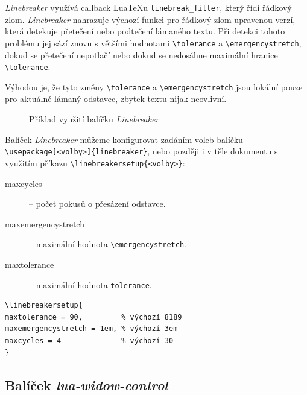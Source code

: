 \documentclass{csbulletin}
\newcommand\balicek[1]{\textit{#1}}
\begin{document}
\balicek{Linebreaker} využívá callback Lua\TeX u \verb|linebreak_filter|, který řídí řádkový zlom.
\balicek{Linebreaker} nahrazuje výchozí funkci pro řádkový zlom upravenou
verzí, která detekuje přetečení nebo podtečení lámaného textu. Při detekci
tohoto problému jej sází znovu s většími hodnotami \verb|\tolerance| a
\verb|\emergencystretch|, dokud se přetečení nepotlačí nebo dokud se nedosáhne
maximální hranice \verb|\tolerance|.

Výhodou je, že tyto změny \verb|\tolerance| a \verb|\emergencystretch| jsou lokální pouze 
pro aktuálně lámaný odstavec, zbytek textu nijak neovlivní. 


\begin{figure}
  \label{fig:linebreaker}
  \caption{Příklad využití balíčku \balicek{Linebreaker}}
\end{figure}


Balíček \balicek{Linebreaker} můžeme konfigurovat zadáním voleb balíčku
\texttt{\textbackslash usepackage[<volby>]\{linebreaker\}}, nebo později i v těle dokumentu s využitím příkazu
\texttt{\textbackslash linebreakersetup\{<volby>\}}:
\medskip

  \begin{description}
    \item[maxcycles] – počet pokusů o přesázení odstavce.
    \item[maxemergencystretch] – maximální hodnota \verb|\emergencystretch|.
    \item[maxtolerance] – maximální hodnota \verb|tolerance|.
  \end{description}

\medskip

\begin{verbatim}
\linebreakersetup{
maxtolerance = 90,         % výchozí 8189
maxemergencystretch = 1em, % výchozí 3em
maxcycles = 4              % výchozí 30
}
\end{verbatim}

\subsection{Balíček \balicek{lua-widow-control}}
\end{document}

